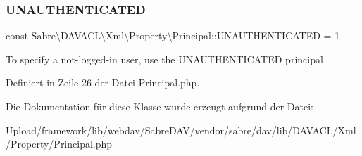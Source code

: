 \mbox{\label{class_sabre_1_1_d_a_v_a_c_l_1_1_xml_1_1_property_1_1_principal_a76758eb0455c764ff35139c4818dbc29}} 
\subsubsection{\texorpdfstring{U\+N\+A\+U\+T\+H\+E\+N\+T\+I\+C\+A\+T\+ED}{UNAUTHENTICATED}}
{\footnotesize\ttfamily const Sabre\textbackslash{}\+D\+A\+V\+A\+C\+L\textbackslash{}\+Xml\textbackslash{}\+Property\textbackslash{}\+Principal\+::\+U\+N\+A\+U\+T\+H\+E\+N\+T\+I\+C\+A\+T\+ED = 1}

To specify a not-\/logged-\/in user, use the U\+N\+A\+U\+T\+H\+E\+N\+T\+I\+C\+A\+T\+ED principal 

Definiert in Zeile 26 der Datei Principal.\+php.



Die Dokumentation für diese Klasse wurde erzeugt aufgrund der Datei\+:\begin{DoxyCompactItemize}
\item 
Upload/framework/lib/webdav/\+Sabre\+D\+A\+V/vendor/sabre/dav/lib/\+D\+A\+V\+A\+C\+L/\+Xml/\+Property/Principal.\+php\end{DoxyCompactItemize}
